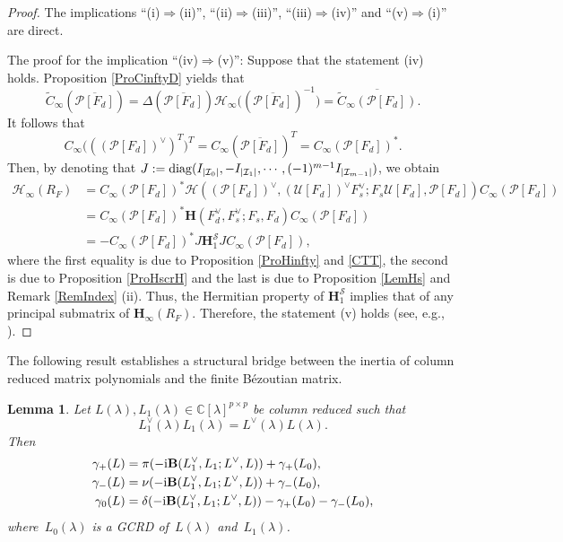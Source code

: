 \documentclass[12pt,reqno]{amsart}
\theoremstyle{plain}
\newtheorem{lemma}[theorem]{Lemma}
\numberwithin{equation}{section}
\theoremstyle{remark}
\def\wtilde{\widetilde} \def\what{\widehat}
\begin{document}
\begin{proof}
The implications ``(i)$\Longrightarrow$(ii)'', ``(ii)$\Longrightarrow$(iii)'', ``(iii)$\Longrightarrow$(iv)'' and ``(v)$\Longrightarrow$(i)'' are direct.

The proof for the implication ``(iv)$\Longrightarrow$(v)'': Suppose that the statement (iv) holds.
Proposition \ref{ProCinftyD} yields that
$$
\wtilde C_{\infty}(\overline{\mathscr P[F_{d}]})=\Delta(\overline{\mathscr P[F_{d}]})\mathscr{H}_{\infty}\big((\overline{\mathscr P[F_{d}]})^{-1}\big)=\overline{\wtilde C_{\infty}(\mathscr P[F_{d}])}.
$$
It follows that
\begin{equation}\label{CTT}
C_{\infty}\big(((\mathscr P[F_{d}])^{\vee})^T\big)^T=C_{\infty}(\overline{\mathscr P[F_{d}]})^T=C_{\infty}(\mathscr P[F_{d}])^*.
\end{equation}
Then, by denoting that $J:={\rm diag}(I_{\left|\mathcal I_0\right|},-I_{\left|\mathcal I_1\right|},\cdots,(-1)^{m-1}I_{\left|\mathcal I_{m-1}\right|})$, we obtain
\begin{align*}
\mathscr{H}_{\infty}(R_F)&=C_{\infty}(\mathscr P[F_d])^* 
\mathscr{H}((\mathscr P[F_{d}])^{\vee},(\mathscr U[F_{d}])^{\vee} F_s^{\vee};F_s \mathscr U[F_d],\mathscr P[F_d])
C_{\infty}(\mathscr P[F_d])\\
&=C_{\infty}(\mathscr P[F_d])^* 
\mathbf{H}(F^{\vee}_{d},F^{\vee}_{s};F_{s},F_{d})
C_{\infty}(\mathscr P[F_d])\\
&=-C_{\infty}(\mathscr P[F_d])^*J 
\mathbf{H}_{1}^{\mathscr S}J
C_{\infty}(\mathscr P[F_d]),
\end{align*} 
where the first equality is due to Proposition \ref{ProHinfty} and \eqref{CTT}, the second is due to Proposition  \ref{ProHscrH} and the last is due to Proposition \ref{LemHs} and Remark \ref{RemIndex} (ii).
Thus, the Hermitian property of $\mathbf{H}_{1}^{\mathscr S}$ implies that of any principal submatrix of $\mathbf{H}_{\infty}(R_F)$. Therefore, the statement (v) holds (see, e.g., \cite{Rudin}).
\end{proof} 

The following result establishes a structural bridge between the inertia of column reduced matrix polynomials and the finite B\'ezoutian matrix.

\begin{lemma}\label{lambdaoutInertia} 
Let $L(\lambda),L_1(\lambda)\in \mathbb C[\lambda]^{p\times p}$ be column reduced such that
\begin{equation*}
L^{\vee}_1(\lambda)L_1(\lambda)=L^{\vee}(\lambda)L(\lambda). 
\end{equation*}
    Then
\begin{align}
\gamma_+(L)&=\pi(-{\rm i} {\bf B}(L_1^{\vee},L_1;L^{\vee},L)) + \gamma_+(L_0), \nonumber  \\
\gamma_-(L)&=\nu(-{\rm i} {\bf B}(L_1^{\vee},L_1;L^{\vee},L)) + \gamma_-(L_0), \nonumber   \\
\gamma_{0}(L)&=\delta(-{\rm i} {\bf B}(L_1^{\vee},L_1;L^{\vee},L))-\gamma_+(L_0)-\gamma_-(L_0), \label{gamma0}
\end{align}
where~$L_0(\lambda)$ is a GCRD of~$L(\lambda)$ and~$L_1(\lambda)$.
\end{lemma}
\end{document}
